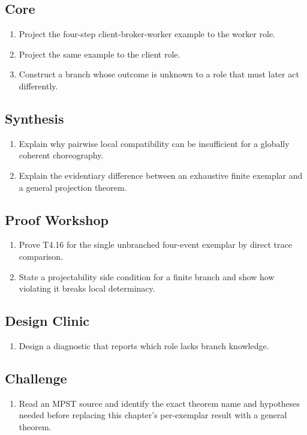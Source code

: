 \subsection*{Core}
\begin{enumerate}[label=\textbf{9.\arabic*},start=4]
\item Project the four-step client-broker-worker example to the worker role.
\item Project the same example to the client role.
\item Construct a branch whose outcome is unknown to a role that must later act differently.
\end{enumerate}
\subsection*{Synthesis}
\begin{enumerate}[label=\textbf{9.\arabic*},start=7]
\item Explain why pairwise local compatibility can be insufficient for a globally coherent choreography.
\item Explain the evidentiary difference between an exhaustive finite exemplar and a general projection theorem.
\end{enumerate}
\subsection*{Proof Workshop}
\begin{enumerate}[label=\textbf{9.\arabic*},start=9]
\item Prove T4.16 for the single unbranched four-event exemplar by direct trace comparison.
\item State a projectability side condition for a finite branch and show how violating it breaks local determinacy.
\end{enumerate}
\subsection*{Design Clinic}
\begin{enumerate}[label=\textbf{9.\arabic*},start=11]
\item Design a diagnostic that reports which role lacks branch knowledge.
\end{enumerate}
\subsection*{Challenge}
\begin{enumerate}[label=\textbf{9.\arabic*},start=12]
\item Read an MPST source and identify the exact theorem name and hypotheses needed before replacing this chapter's per-exemplar result with a general theorem.
\end{enumerate}
